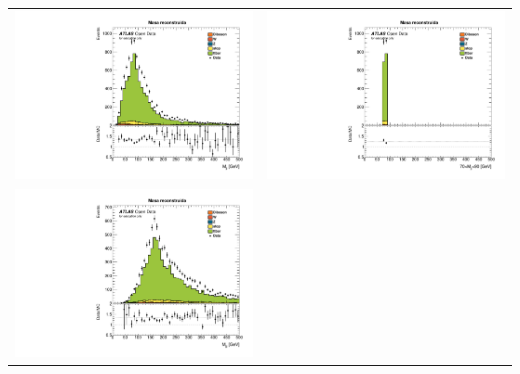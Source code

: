 \documentclass[10pt]{beamer}
\begin{document}
\begin{frame}
\begin{center}
	\begin{tabular}{cc}
		
			\includegraphics[scale=0.22]{recoWmass} &
		
		
		\includegraphics[scale=0.22]{recoWmassbis} \\
		\includegraphics[scale=0.22]{reconsmass} &
		

\end{tabular}
\end{center}
\end{frame}
\end{document}
